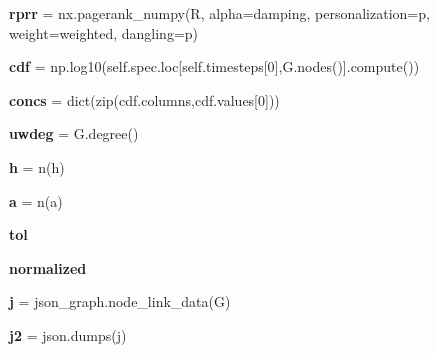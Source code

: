 \begin{DoxyCompactItemize}
\mbox{\label{namespacedsmacc_1_1vis_1_1degree_aba00231671e18adcab7788fca00446fa}} 
{\bfseries rprr} = nx.\+pagerank\+\_\+numpy(R, alpha=damping, personalization=p, weight=\textquotesingle{}weighted\textquotesingle{}, dangling=p)
\item 
\mbox{\label{namespacedsmacc_1_1vis_1_1degree_a7d500e37b5140fb164e7eb24dea63e78}} 
{\bfseries cdf} = np.\+log10(self.\+spec.\+loc\mbox{[}self.\+timesteps\mbox{[}0\mbox{]},G.\+nodes()\mbox{]}.compute())
\item 
\mbox{\label{namespacedsmacc_1_1vis_1_1degree_aa63d4c0784ab393b944958f0171ee1d0}} 
{\bfseries concs} = dict(zip(cdf.\+columns,cdf.\+values\mbox{[}0\mbox{]}))
\item 
\mbox{\label{namespacedsmacc_1_1vis_1_1degree_aa792aaba80547f3f9178a05dfa076b93}} 
{\bfseries uwdeg} = G.\+degree()
\item 
\mbox{\label{namespacedsmacc_1_1vis_1_1degree_a05d5156cf1380d8679218a37e1717bd0}} 
{\bfseries h} = n(h)
\item 
\mbox{\label{namespacedsmacc_1_1vis_1_1degree_a690218e8019be38508821c371d4606a3}} 
{\bfseries a} = n(a)
\item 
\mbox{\label{namespacedsmacc_1_1vis_1_1degree_a3c217eff6aa45c194772940f9182c7bc}} 
{\bfseries tol}
\item 
\mbox{\label{namespacedsmacc_1_1vis_1_1degree_a5cf98bc87d5ee539c0718a3e2e35faa8}} 
{\bfseries normalized}
\item 
\mbox{\label{namespacedsmacc_1_1vis_1_1degree_adf9418ca0fc061b3f08cfe1f22e173f1}} 
{\bfseries j} = json\+\_\+graph.\+node\+\_\+link\+\_\+data(G)
\item 
\mbox{\label{namespacedsmacc_1_1vis_1_1degree_a76fa67b7bf008ae01116185ccfc7f17c}} 
{\bfseries j2} = json.\+dumps(j)

\end{DoxyCompactItemize}
